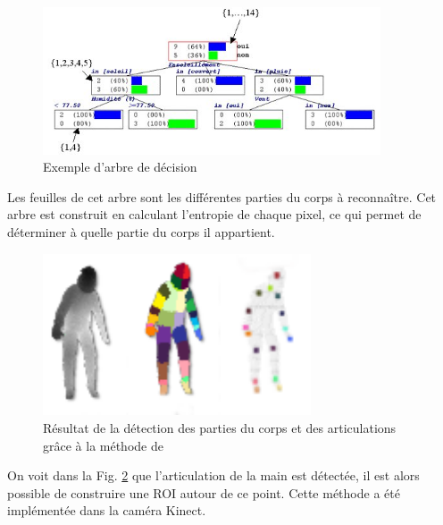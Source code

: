 \begin{figure}[!h]
   \begin{center}
     \includegraphics[width=10cm]{images/Arbre_de_decision.jpg}
     \caption{Exemple d'arbre de décision}
     \label{fig:arbre}
   \end{center}
 \end{figure} 
 
Les feuilles de cet arbre sont les différentes parties du corps à reconnaître. Cet arbre est construit en calculant
l'entropie de chaque pixel, ce qui permet de déterminer à quelle partie du corps il appartient.\\

\begin{figure}[!h]
 \begin{center}
  \includegraphics[width=300px]{images/bodyrecognition.png}
  \caption{Résultat de la détection des parties du corps et des articulations grâce à la méthode de \cite{export:145347}}
  \label{fig:bodyrecognition}
 \end{center}
\end{figure}

On voit dans la Fig. \ref{fig:bodyrecognition} que l'articulation de la main est détectée, il est alors possible de construire
une ROI autour de ce point. Cette méthode a été implémentée dans la caméra Kinect.\\


